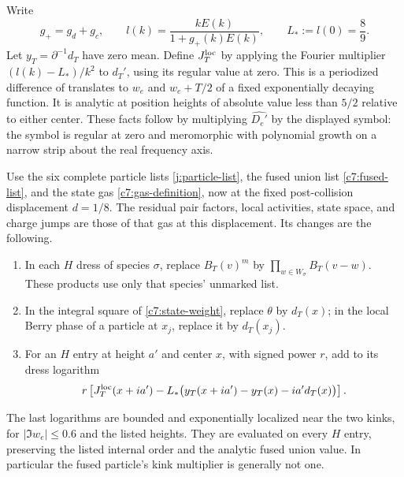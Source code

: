 Write
\[
 g_+=g_d+g_c,\qquad
 l(k)=\frac{kE(k)}{1+g_+(k)E(k)},\qquad L_*:=l(0)=\frac89.
\]
Let $y_T=\partial^{-1}d_T$ have zero mean. Define $J_T^{\rm loc}$
by applying the Fourier multiplier $(l(k)-L_*)/k^2$ to $d_T'$,
using its regular value at zero. This is a periodized difference
of translates to $w_e$ and $w_e+T/2$ of a fixed exponentially
decaying function. It is analytic at position heights of absolute
value less than $5/2$ relative to either center. These facts
follow by multiplying $\widehat{D_e'}$ by the displayed symbol:
the symbol is regular at zero and meromorphic with polynomial
growth on a narrow strip about the real frequency axis.

Use the six complete particle lists \eqref{j:particle-list}, the
fused union list \eqref{c7:fused-list}, and the state gas
\eqref{c7:gas-definition}, now at the fixed post-collision
displacement $d=1/8$. The residual pair factors, local activities,
state space, and charge jumps are those of that gas at this
displacement. Its changes are the following.

\begin{enumerate}
\item In each $H$ dress of species $\sigma$, replace $B_T(v)^m$
by $\prod_{w\in W_\sigma}B_T(v-w)$. These products use only that
species' unmarked list.
\item In the integral square of \eqref{c7:state-weight}, replace
$\theta$ by $d_T(x)$; in the local Berry phase of a particle at
$x_j$, replace it by $d_T(x_j)$.
\item For an $H$ entry at height $a'$ and center $x$, with signed
power $r$, add to its dress logarithm
\begin{equation}\label{j:marked-local-dress}
 r\left[J_T^{\rm loc}(x+ia')
  -L_*\bigl(y_T(x+ia')-y_T(x)-ia'd_T(x)\bigr)\right].
\end{equation}
\end{enumerate}

The last logarithms are bounded and exponentially localized near
the two kinks, for $|\Im w_e|\le0.6$ and the listed heights. They
are evaluated on every $H$ entry, preserving the listed internal
order and the analytic fused union value. In particular the fused
particle's kink multiplier is generally not one.

